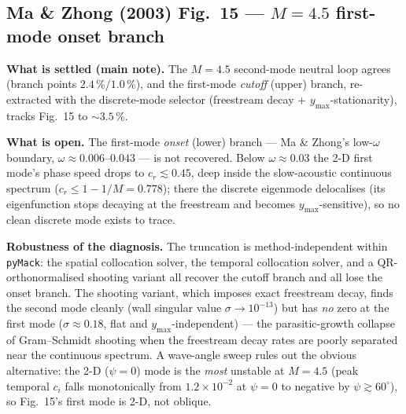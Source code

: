 \documentclass[11pt]{article}
\begin{document}
\subsection{Ma \& Zhong (2003) Fig.~15 --- $M=4.5$ first-mode onset branch}
\label{sec:mazhong-onset}

\textbf{What is settled (main note).} The $M=4.5$ second-mode neutral loop agrees
(branch points $2.4\,\%$/$1.0\,\%$), and the first-mode \emph{cutoff} (upper)
branch, re-extracted with the discrete-mode selector (freestream decay $+$
$y_{\max}$-stationarity), tracks Fig.~15 to $\sim\!3.5\,\%$.

\textbf{What is open.} The first-mode \emph{onset} (lower) branch --- Ma \&
Zhong's low-$\omega$ boundary, $\omega\approx0.006$--$0.043$ --- is not recovered.
Below $\omega\approx0.03$ the 2-D first mode's phase speed drops to
$c_r\!\lesssim\!0.45$, deep inside the slow-acoustic continuous spectrum
($c_r\le1-1/M=0.778$); there the discrete eigenmode delocalises (its eigenfunction
stops decaying at the freestream and becomes $y_{\max}$-sensitive), so no clean
discrete mode exists to trace.

\textbf{Robustness of the diagnosis.} The truncation is method-independent within
\texttt{pyMack}: the spatial collocation solver, the temporal collocation solver,
and a QR-orthonormalised shooting variant all recover the cutoff branch and all
lose the onset branch. The shooting variant, which imposes exact freestream decay,
finds the second mode cleanly (wall singular value $\sigma\!\to\!10^{-13}$) but has
\emph{no} zero at the first mode ($\sigma\approx0.18$, flat and
$y_{\max}$-independent) --- the parasitic-growth collapse of Gram--Schmidt shooting
when the freestream decay rates are poorly separated near the continuous spectrum.
A wave-angle sweep rules out the obvious alternative: the 2-D ($\psi=0$) mode is
the \emph{most} unstable at $M=4.5$ (peak temporal $c_i$ falls monotonically from
$1.2\times10^{-2}$ at $\psi=0$ to negative by $\psi\gtrsim60^\circ$), so Fig.~15's
first mode is 2-D, not oblique.

\end{document}
